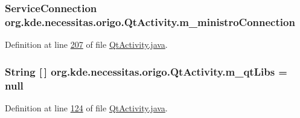 \hypertarget{classorg_1_1kde_1_1necessitas_1_1origo_1_1_qt_activity_ac39b27250b5abe8701c4e96f1450f8e0}{
\subsubsection[{m\-\_\-ministro\-Connection}]{\setlength{\rightskip}{0pt plus 5cm}Service\-Connection org.\-kde.\-necessitas.\-origo.\-Qt\-Activity.\-m\-\_\-ministro\-Connection\hspace{0.3cm}{\ttfamily [private]}}}\label{db/d37/classorg_1_1kde_1_1necessitas_1_1origo_1_1_qt_activity_ac39b27250b5abe8701c4e96f1450f8e0}


Definition at line \hyperlink{_qt_activity_8java_source_l00207}{207} of file \hyperlink{_qt_activity_8java_source}{Qt\-Activity.\-java}.

\hypertarget{classorg_1_1kde_1_1necessitas_1_1origo_1_1_qt_activity_a9d5760ab4fabf51a69e4e981c1ed0ac3}{
\subsubsection[{m\-\_\-qt\-Libs}]{\setlength{\rightskip}{0pt plus 5cm}String \mbox{[}$\,$\mbox{]} org.\-kde.\-necessitas.\-origo.\-Qt\-Activity.\-m\-\_\-qt\-Libs = null\hspace{0.3cm}{\ttfamily [private]}}}\label{db/d37/classorg_1_1kde_1_1necessitas_1_1origo_1_1_qt_activity_a9d5760ab4fabf51a69e4e981c1ed0ac3}


Definition at line \hyperlink{_qt_activity_8java_source_l00124}{124} of file \hyperlink{_qt_activity_8java_source}{Qt\-Activity.\-java}.

